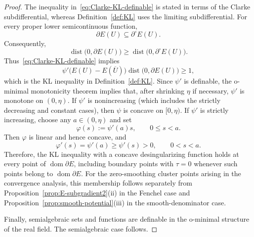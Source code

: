 \documentclass[9pt]{article}
\numberwithin{equation}{section}
\theoremstyle{definition}
\theoremstyle{remark}
\DeclareMathOperator{\dist}{dist}
\begin{document}
\begin{proof}
The inequality in~\eqref{eq:Clarke-KL-definable} is stated in terms of
the Clarke subdifferential, whereas Definition~\ref{def:KL} uses the
limiting subdifferential. For every proper lower semicontinuous
function,
\[
 \partial E(U)\subseteq\partial^\circ E(U).
\]
Consequently,
$$
 \dist\bigl(0,\partial E(U)\bigr)
 \geq
 \dist\bigl(0,\partial^\circ E(U)\bigr).
$$
Thus~\eqref{eq:Clarke-KL-definable} implies
$$
 \psi'\bigl(E(U)-E(\overline U)\bigr)
 \dist\bigl(0,\partial E(U)\bigr)\geq1,
$$
which is the KL inequality
in Definition~\ref{def:KL}.
Since $\psi'$ is definable, the o-minimal monotonicity theorem
\cite[Chapter~3, Section~1]{vanDenDries1998} implies that, after
shrinking $\eta$ if necessary, $\psi'$ is monotone on $(0,\eta)$.
If $\psi'$ is nonincreasing (which includes the strictly decreasing
and constant cases), then $\psi$ is concave on $[0,\eta)$.
If $\psi'$ is strictly increasing, choose any $a\in(0,\eta)$ and set
\[
   \varphi(s):=\psi'(a)s,\qquad 0\le s<a.
\]
Then $\varphi$ is linear and hence concave, and
\[
   \varphi'(s)=\psi'(a)\geq \psi'(s)>0,
   \qquad 0<s<a.
\]
Therefore, the KL inequality with a concave desingularizing function holds at every point of \(\operatorname{dom}\partial E\), including boundary points with \(\tau=0\) whenever such points belong to \(\operatorname{dom}\partial E\). For the zero-smoothing cluster points arising in the convergence analysis, this membership follows separately from Proposition~\ref{prop:E-subgradient2}(ii) in the Fenchel case and Proposition~\ref{prop:smooth-potential}(iii) in the smooth-denominator case.

Finally, semialgebraic sets and functions are definable in the
o-minimal structure of the real field. The semialgebraic case follows.
\end{proof}
\end{document}
